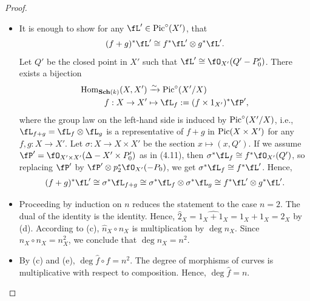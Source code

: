 \documentclass[a4paper]{article}
\begin{document}
\begin{enumerate} [label=\textbf{\arabic*.}, leftmargin=0em]
\begin{proof}
\begin{itemize} [leftmargin=0cm]
                  \item[(d)] It is enough to show for any $\fL' \in \pic^\circ(X')$, that
                        \begin{equation*}
                            (f + g)^*\fL' \cong f^*\fL' \otimes g^*\fL'.
                        \end{equation*}
                        Let $Q'$ be the closed point in $X'$ such that $\fL' \cong \fO_{X'}(Q' - P_0')$.
                        There exists a bijection
                        \begin{align*}
                            \Hom_{\ckSch{k}}(X, X') & \xrightarrow{\sim} \pic^\circ(X'/X)       \\
                            f : X \to X'            & \mapsto \fL_f := (f \times 1_{X'})^*\fP',
                        \end{align*}
                        where the group law on the left-hand side is induced by $\operatorname{Pic}^\circ(X'/X)$, i.e., $\fL_{f + g} = \fL_f \otimes \fL_g$ is a representative of $f + g$ in $\operatorname{Pic}(X \times X')$ for any $f, g : X \to X'$.
                        Let $\sigma : X \to X \times X'$ be the section $x \mapsto (x, Q')$.
                        If we assume $\fP' = \fO_{X' \times X'}(\Delta - X' \times P_0')$ as in (4.11), then $\sigma^* \fL_f \cong f^*\fO_{X'}(Q')$, so replacing $\fP'$ by $\fP' \otimes p_2^*\fO_{X'}(-P_0)$, we get $\sigma^*\fL_f \cong f^*\fL'$.
                        Hence,
                        \begin{align*}
                            (f + g)^* \fL' \cong \sigma^* \fL_{f + g} \cong \sigma^*\fL_f \otimes \sigma^* \fL_g \cong f^*\fL' \otimes g^*\fL'.
                        \end{align*}

                  \item[(e)] Proceeding by induction on $n$ reduces the statement to the case $n = 2$.
                        The dual of the identity is the identity.
                        Hence, $\hat{2}_X = \widehat{1_X + 1_X} = 1_X + 1_X = 2_X$ by (d).
                        According to (c), $\hat{n}_X \circ n_X$ is multiplication by $\deg{n_X}$.
                        Since $\hat{n}_X \circ n_X = n^2_X$, we conclude that $\deg{n_X} = n^2$.

                  \item[(f)] By (c) and (e), $\deg \hat{f} \circ f = n^2$.
                        The degree of morphisms of curves is multiplicative with respect to composition.
                        Hence, $\deg{\hat{f}} = n$.
              \end{itemize}
          \end{proof}


\end{enumerate}
\end{document}
